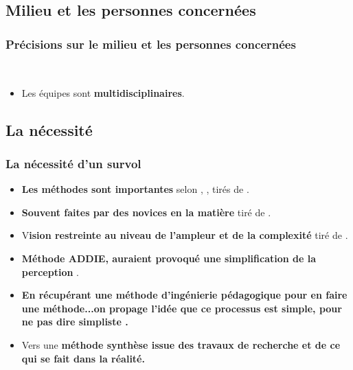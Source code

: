\subsection{Milieu et les personnes concernées} 
		\begin{frame}[allowframebreaks]
			\frametitle{Précisions sur le milieu et les personnes concernées}
                        \
                        \begin{itemize} 
                        \item  Les équipes sont \textbf{multidisciplinaires}.
                       

                        \end{itemize}

             
                \end{frame}

\subsection{La nécessité} 
		\begin{frame}[allowframebreaks]
			\frametitle{La nécessité d’un survol}
                        
                        \begin{itemize} 
                        \item  \textbf{Les méthodes sont importantes} selon \citet[p. 842]{bohl2002a}, \citet[p. 218]{barry2003a}, \citet[p. 1]{hadjerrouit2007a} tirés de \cite{bonneau2013a}.
                        \item \textbf{Souvent faites par des novices en la matière} \citep[p. 351]{verstegen2008a} tiré de \citet{bonneau2013a}.
                        \item V\textbf{ision restreinte au niveau de l’ampleur et de la complexité} \citep[p. 105]{roy2011a} tiré de \citet{bonneau2013a}.
                        \item \textbf{Méthode ADDIE, auraient provoqué une simplification de la perception}  \citep[p.28]{bonneau2013a}.
                        \item \textbf{En récupérant une méthode d’ingénierie pédagogique pour en faire une méthode...on propage l’idée que ce processus est simple, pour ne pas dire simpliste \citep[p.29]{bonneau2013a}.}
                        \item Vers une \textbf{méthode synthèse issue des travaux de recherche et de ce qui se fait dans la réalité.}

                        \end{itemize}

             
                \end{frame}
                
